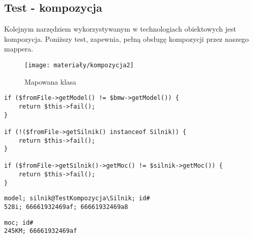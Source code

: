 \subsection{Test - kompozycja}
Kolejnym narzędziem wykorzystywanym w technologiach obiektowych jest kompozycja. Poniższy test, zapewnia, pełną obsługę kompozycji przez naszego mappera. 

\begin{figure}[ht]
	\centering
	\texttt{[image: materiały/kompozycja2]}
	\caption{Mapowana klasa}
\end{figure}

\begin{empty}
	\begin{verbatim}
if ($fromFile->getModel() != $bmw->getModel()) {
	return $this->fail();
}

if (!($fromFile->getSilnik() instanceof Silnik)) {
	return $this->fail();
}

if ($fromFile->getSilnik()->getMoc() != $silnik->getMoc()) {
	return $this->fail();
}
	\end{verbatim}
	\vspace{-10pt}
\end{empty}

\begin{empty}
	\begin{verbatim}
model; silnik@TestKompozycja\Silnik; id#
528i; 66661932469af; 66661932469a8
	\end{verbatim}
	\vspace{-10pt}
\end{empty}

\begin{empty}
	\begin{verbatim}
moc; id#
245KM; 66661932469af
	\end{verbatim}
	\vspace{-10pt}
\end{empty}

